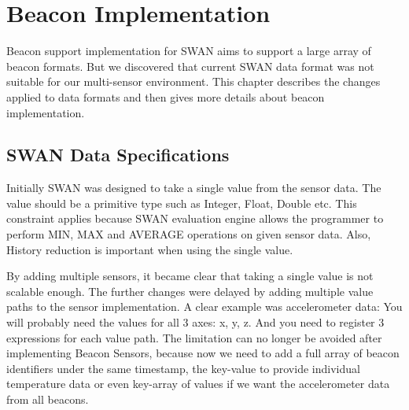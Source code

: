 
\chapter{Beacon Implementation}%

\label{Chapter4} %

Beacon support implementation for SWAN aims to support a large array of beacon formats. But we discovered that current SWAN data format was not suitable 
for our multi-sensor environment. This chapter describes the changes applied to data formats and then gives more details about beacon implementation.


\section{SWAN Data Specifications}\label{ssec:swandataspecifications} 

Initially SWAN was designed to take a single value from the sensor data.
The value should be a primitive type such as Integer, Float, Double etc.
This constraint applies because SWAN evaluation engine allows the programmer to perform MIN, MAX and AVERAGE operations on given sensor data.
Also, History reduction is important when using the single value.

By adding multiple sensors, it became clear that taking a single value is not scalable enough. 
The further changes were delayed by adding multiple value paths to the sensor implementation. 
A clear example was accelerometer data: You will probably need the values for all 3 axes: x, y, z.
And you need to register 3 expressions for each value path.
The limitation can no longer be avoided after implementing Beacon Sensors, because now we need to add a full array of beacon identifiers under the same timestamp,
the key-value to provide individual temperature data or even key-array of values if we want the accelerometer data from all beacons.

